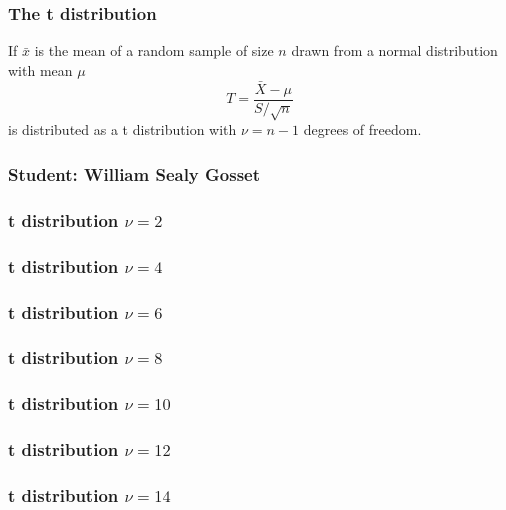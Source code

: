 \begin{frame}[fragile]\frametitle{The t distribution}
\begin{thm}
If $\bar{x}$ is the mean of a random sample of
size $n$ drawn from a normal distribution with
mean $\mu$
$$T = \frac{\bar{X}-\mu}{S/\sqrt{n}}$$
is distributed as a t distribution with $\nu = n-1$
degrees of freedom.
\end{thm}

\end{frame}

\begin{frame}[fragile]\frametitle{Student: William Sealy Gosset}


\end{frame}

\begin{frame}[fragile]\frametitle{t distribution $\nu=2$}

\end{frame}

\begin{frame}[fragile]\frametitle{t distribution $\nu=4$}

\end{frame}

\begin{frame}[fragile]\frametitle{t distribution $\nu=6$}

\end{frame}

\begin{frame}[fragile]\frametitle{t distribution $\nu=8$}

\end{frame}

\begin{frame}[fragile]\frametitle{t distribution $\nu=10$}

\end{frame}

\begin{frame}[fragile]\frametitle{t distribution $\nu=12$}

\end{frame}
\begin{frame}[fragile]\frametitle{t distribution $\nu=14$}

\end{frame}

